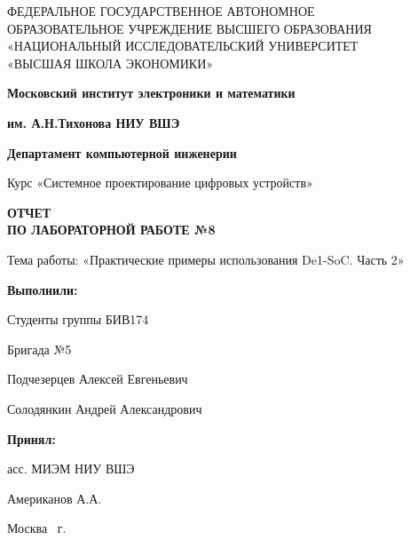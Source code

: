 \begin{titlepage}
	\begin{center}
 		ФЕДЕРАЛЬНОЕ  ГОСУДАРСТВЕННОЕ АВТОНОМНОЕ \\
		ОБРАЗОВАТЕЛЬНОЕ УЧРЕЖДЕНИЕ ВЫСШЕГО ОБРАЗОВАНИЯ\\
		«НАЦИОНАЛЬНЫЙ ИССЛЕДОВАТЕЛЬСКИЙ УНИВЕРСИТЕТ\\
		«ВЫСШАЯ ШКОЛА ЭКОНОМИКИ»
	\end{center}
	
	\begin{center}
		\textbf{Московский институт электроники и математики}
		
		\textbf{им. А.Н.Тихонова НИУ ВШЭ}
		
		\vspace{2ex}
		
		\textbf{Департамент компьютерной инженерии}
	\end{center}
	\vspace{1ex}	
	
	\begin{center}
		Курс «Системное проектирование цифровых устройств»
	\end{center}	
	
	
	\begin{center}
	\textbf{ОТЧЕТ\\
		ПО ЛАБОРАТОРНОЙ РАБОТЕ №8
	}
	\end{center}	

	\begin{center}
		Тема работы: «Практические примеры использования De1-SoC. Часть 2»
	\end{center}

	\vspace{2ex}

	\begin{flushright}
		\textbf{Выполнили:}
		
		\vspace{2ex}
		
		Студенты группы БИВ174
		
		Бригада №5
		
		\vspace{2ex}
		
		Подчезерцев Алексей Евгеньевич
		
		Солодянкин Андрей Александрович
		\vspace{2ex}
		
		\textbf{Принял:}
		
		асс. МИЭМ НИУ ВШЭ
		
		Американов А.А.
		
	\end{flushright}

	\vfill
	\begin{center}
		Москва \the\year \, г.
	\end{center}
	
\end{titlepage}
\addtocounter{page}{1}